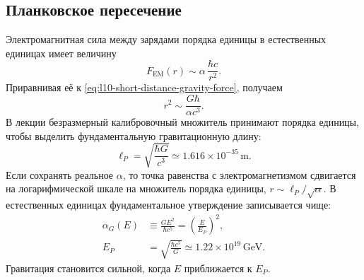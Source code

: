 \begin{classroomqa}
\end{classroomqa}

\begin{classroomqa}
\end{classroomqa}

\subsection{Планковское пересечение}

Электромагнитная сила между зарядами порядка единицы в естественных единицах имеет величину
\begin{equation}
  F_{\mathrm{EM}}(r)
  \sim
  \alpha\,\frac{\hbar c}{r^2}.
  \label{eq:l10-em-force-alpha}
\end{equation}
Приравнивая её к \eqref{eq:l10-short-distance-gravity-force}, получаем
\begin{equation}
  r^2\sim\frac{G\hbar}{\alpha c^3}.
  \label{eq:l10-gravity-em-crossing}
\end{equation}
В лекции безразмерный калибровочный множитель принимают порядка единицы, чтобы выделить фундаментальную гравитационную длину:
\begin{equation}
  \boxed{\ell_P=\sqrt{\frac{\hbar G}{c^3}}}
  \simeq1.616\times10^{-35}\,\mathrm{m}.
  \label{eq:l10-planck-length}
\end{equation}
Если сохранять реальное \(\alpha\), то точка равенства с электромагнетизмом сдвигается на логарифмической шкале на множитель порядка единицы, \(r\sim\ell_P/\sqrt\alpha\). В естественных единицах фундаментальное утверждение записывается чище:
\begin{equation}
\begin{aligned}
  \alpha_G(E)
  &\equiv\frac{GE^2}{\hbar c^5}
  =\left(\frac{E}{E_P}\right)^2,
  \\
  E_P
  &=\sqrt{\frac{\hbar c^5}{G}}
  \simeq1.22\times10^{19}\,\mathrm{GeV}.
\end{aligned}
  \label{eq:l10-gravitational-coupling}
\end{equation}
Гравитация становится сильной, когда \(E\) приближается к \(E_P\).

